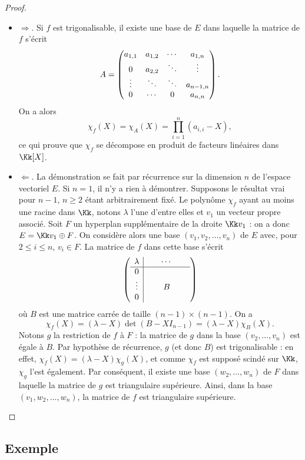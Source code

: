 \documentclass[12pt, class=report,crop=false]{standalone}
\begin{document}
\begin{proof}~
\begin{itemize}

\item $\Longrightarrow$. 
Si $f$ est trigonalisable, il existe une base de $E$ dans laquelle la matrice de $f$ s'écrit
$$A=\begin{pmatrix}a_{1,1}&a_{1,2}&\cdots &a_{1,n} \cr 0&a_{2,2} &\ddots &\vdots \cr\vdots &\ddots &\ddots& a_{n-1,n}\cr0&\cdots&0&a_{n,n}\end{pmatrix}.$$
On a alors
$$\chi_f(X)=\chi_A(X)=\prod_{i=1}^n(a_{i,i}-X),$$
ce qui prouve que $\chi_f$ se décompose en produit de facteurs linéaires dans $\Kk[X]$.

\item $\Longleftarrow$.
La démonstration se fait par récurrence sur la dimension $n$ de l'espace vectoriel $E$. 
Si $n=1$, il n'y a rien à démontrer. Supposons le résultat vrai pour $n-1$, $n\ge2$ étant arbitrairement fixé. Le polynôme $\chi_f$ ayant au moins une racine dans $\Kk$, 
notons $\lambda$ l'une d'entre elles et $v_1$ un vecteur propre associé. 
Soit $F$ un hyperplan supplémentaire de la droite $\Kk v_1$ : on a donc $E = \Kk v_1 \oplus F$. 
On considère alors une base $(v_1,v_2,\ldots,v_n)$ de $E$ avec, pour $2 \le i \le n$, 
$v_i\in F$. La matrice de $f$ dans cette base s'écrit
$$\left(\begin{array}{c|ccc}
\lambda &\ \  &\cdots&\ \  \cr \hline
0 &\ &\ & \cr
\vdots& & B &\cr
0&\ &\ &\  
\end{array}\right)$$
où $B$ est une matrice carrée de taille $(n-1)\times(n-1)$. On a 
$$\chi_f(X)=(\lambda-X)\det(B-X I_{n-1})=(\lambda-X)\chi_B(X).$$
Notons $g$ la restriction de $f$ à $F$ : la matrice de $g$ dans la base $(v_2,\ldots,v_n)$ est égale à $B$. Par hypothèse de récurrence, $g$ (et donc $B$) est trigonalisable : en effet, $\chi_f(X)=(\lambda-X)\chi_g(X)$,
 et comme $\chi_f$ est supposé scindé sur $\Kk$, $\chi_g$ l'est également. 
 Par conséquent, il existe une base $(w_2,\ldots,w_n)$ de $F$ dans laquelle la matrice de $g$ est triangulaire supérieure. Ainsi, dans la base $(v_1,w_2,\ldots,w_n)$, la matrice de $f$ est triangulaire supérieure.
\end{itemize}
\end{proof} 



\subsection{Exemple}
\end{document}
